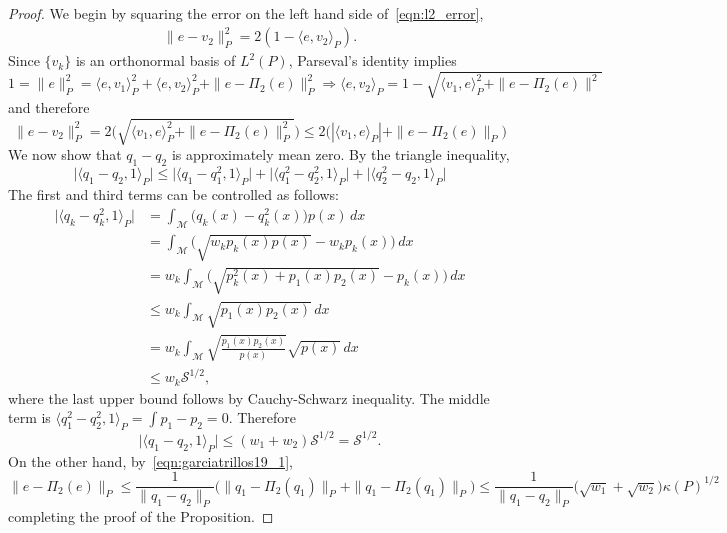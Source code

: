 \documentclass{article}
\newcommand{\1}{\mathbf{1}}
\newcommand{\mc}[1]{\mathcal{#1}}
\newcommand{\dotp}[2]{\langle #1, #2 \rangle}
\theoremstyle{alden}
\theoremstyle{aldenthm}
\theoremstyle{definition}
\theoremstyle{remark}
\begin{document}
\begin{proof}
	We begin by squaring the error on the left hand side of~\eqref{eqn:l2_error}, 
	\begin{align}
	\|e - v_2\|_P^2 = 2(1 - \dotp{e}{v_2}_P).
	\end{align}
	Since $\{v_k\}$ is an orthonormal basis of $L^2(P)$, Parseval's identity implies
	\begin{equation*}
	1 = \|e\|_P^2 = \dotp{e}{v_1}_P^2 + \dotp{e}{v_2}_P^2 + \|e - \Pi_2(e)\|_P^2 \Longrightarrow \dotp{e}{v_2}_P = 1 - \sqrt{\dotp{v_1}{e}_P^2 + \|e - \Pi_2(e)\|^2}
	\end{equation*}
	and therefore
	\begin{equation*}
	\|e - v_2\|_P^2 = 2\biggl(\sqrt{\dotp{v_1}{e}_P^2 + \|e - \Pi_2(e)\|_P^2}\biggr)\leq 2\biggl(|\dotp{v_1}{e}_P| + \|e - \Pi_2(e)\|_P\biggr)
	\end{equation*}
	We now show that $q_1 - q_2$ is approximately mean zero. By the triangle inequality,
	\begin{equation*}
	\bigl|\langle q_1 - q_2,1 \rangle_P\bigr| \leq \bigl| \langle q_1 - q_1^2,1\rangle_{P} \bigr| + \bigl| \langle q_1^2 - q_2^2,1\rangle_{P} \bigr| + \bigl| \langle q_2^2 - q_2,1\rangle_{P} \bigr|
	\end{equation*}
	The first and third terms can be controlled as follows:
	\begin{align*}
	\bigl| \langle q_k - q_k^2,1\rangle_{P} \bigr| & = \int_{\mc{M}} \bigl(q_k(x) - q_k^2(x)\bigr) p(x) \,dx \\
	& = \int_{\mc{M}} \bigl(\sqrt{w_kp_k(x)p(x)} - w_kp_k(x)\bigr) \,dx \\
	& = w_k \int_{\mc{M}} \bigl(\sqrt{p_k^2(x) + p_1(x)p_2(x)} - p_k(x)\bigr)  \,dx \\
	& \leq w_k \int_{\mc{M}} \sqrt{p_1(x)p_2(x)}\,dx \\
	& = w_k \int_{\mc{M}} \sqrt{\frac{p_1(x)p_2(x)}{p(x)}} \sqrt{p(x)} \,dx \\
	& \leq w_k \mc{S}^{1/2},
	\end{align*}
	where the last upper bound follows by Cauchy-Schwarz inequality. The middle term is $\langle q_1^2 - q_2^2,1\rangle_{P} = \int p_1 - p_2 = 0$. Therefore
	\begin{equation*}
	\bigl|\langle q_1 - q_2,1 \rangle_P\bigr| \leq (w_1 + w_2)\mc{S}^{1/2} = \mc{S}^{1/2}.
	\end{equation*}
	On the other hand, by~\eqref{eqn:garciatrillos19_1}, 
	\begin{equation*}
	\|e - \Pi_2(e)\|_P \leq \frac{1}{\|q_1 - q_2\|_P}\biggl(\|q_1 - \Pi_2(q_1)\|_P + \|q_1 - \Pi_2(q_1)\|_P\biggr) \leq \frac{1}{\|q_1 - q_2\|_P}\bigl(\sqrt{w_1} + \sqrt{w_2}\bigr)\kappa(P)^{1/2}
	\end{equation*}
	completing the proof of the Proposition.
\end{proof}
\end{document}
